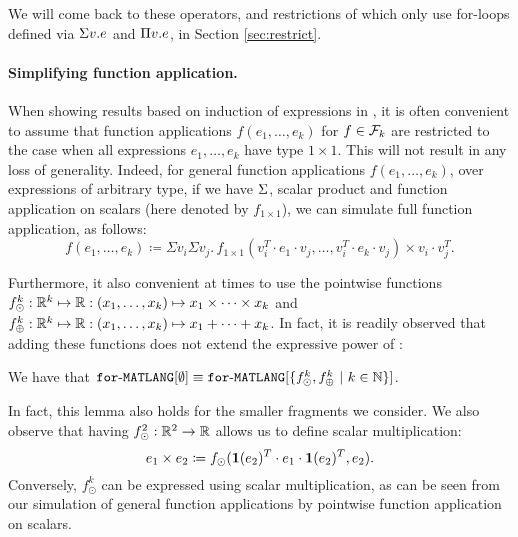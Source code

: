 We will come back to these operators, and restrictions of \langfor which only use for-loops defined via $\Sigma v.e$ and $\Pi v.e$, in Section \ref{sec:restrict}.

\paragraph{Simplifying function application.} When showing results based on induction of expressions in \langfor, it is often convenient to assume that function applications $f(e_1,\ldots,e_k)$ for $f\in\mathcal{F}_k$ are restricted to
the case when all expressions $e_1,\ldots,e_k$ have type $1\times 1$. This will not result in any loss of generality. Indeed,
for general function applications $f(e_1,\ldots,e_k)$, over expressions of arbitrary type, if we have $\Sigma$, scalar product and function application on scalars (here denoted by $f_{1\times 1}$), we can simulate full function application, as follows:
 $$
f(e_1,\ldots, e_k) \coloneqq \Sigma v_i \Sigma v_j. \, f_{1\times 1}(v_i^T\cdot e_1\cdot v_j, \ldots ,v_i^T\cdot e_k\cdot v_j) \times v_i\cdot v_j^T.
$$

Furthermore, it also convenient at times to use the pointwise functions
$f_\odot^k:\mathbb{R}^k\mapsto \mathbb{R}:(x_1,\ldots,x_k)\mapsto x_1\times \cdots \times x_k$ and 
$f_\oplus^k:\mathbb{R}^k\mapsto \mathbb{R}:(x_1,\ldots,x_k)\mapsto x_1+\cdots + x_k$. In fact, it is readily observed that adding these functions does not extend the expressive power of \langfor:
\begin{lemma}
\label{lm-prod-sum}
We have that $\texttt{for}\text{-}\texttt{MATLANG}[\emptyset] \equiv \texttt{for}\text{-}\texttt{MATLANG}[\{f_\odot^k,f_\oplus^k \ | \ k\in \mathbb{N}\}]$.
\end{lemma}
In fact, this lemma also holds for the smaller fragments we consider.
%
We also observe that having $f_\odot^2:\mathbb{R}^2\to\mathbb{R}$ allows us to define scalar multiplication:
$$
e_1\times e_2 \coloneqq f_{\odot}(\mathbf{1}(e_2)^T\cdot e_1 \cdot \mathbf{1}(e_2)^T, e_2).
$$
Conversely, $f_\odot^k$ can be expressed using scalar multiplication, as can be seen from our simulation of general function applications by pointwise function application on scalars.
